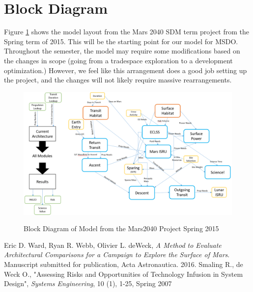 \documentclass[11pt]{article} %
\begin{document}
\section{Block Diagram}
Figure \ref{fig:m2040block} shows the model layout from the Mars 2040 SDM term project from the Spring term of 2015.  This will be the starting point for our model for MSDO.  Throughout the semester, the model may require some modifications based on the changes in scope (going from a tradespace exploration to a development optimization.) However, we feel like this arrangement does a good job setting up the project, and the changes will not likely require massive rearrangements.
\begin{figure}
\includegraphics[width=\textwidth]{M2040Block}
\label{fig:m2040block}
\caption{Block Diagram of Model from the Mars2040 Project Spring 2015}
\end{figure}

\clearpage
\begin{thebibliography}{1}
 Eric D. Ward, Ryan R. Webb, Olivier L. deWeck, {\em A Method to Evaluate Architectural Comparisons for a Campaign to Explore the Surface of Mars}. Manuscript submitted for publication, Acta Astronautica. 2016.
Smaling R., de Weck O., "Assessing Risks and Opportunities of Technology Infusion in System Design", {\em Systems Engineering}, 10 (1), 1-25, Spring 2007
\end{thebibliography}

\clearpage

\end{document}
